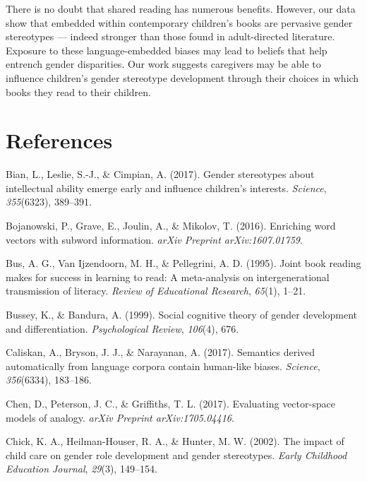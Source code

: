 \documentclass[
  english,
  ,man,floatsintext]{apa6}
\begin{document}
There is no doubt that shared reading has numerous benefits. However, our data show that embedded within contemporary children's books are pervasive gender stereotypes --- indeed stronger than those found in adult-directed literature. Exposure to these language-embedded biases may lead to beliefs that help entrench gender disparities. Our work suggests caregivers may be able to influence children's gender stereotype development through their choices in which books they read to their children.

\newpage

\hypertarget{references}{%
\section{References}\label{references}}

\setlength{\parindent}{-0.5in}
\setlength{\leftskip}{0.5in}

\hypertarget{refs}{}
\leavevmode\hypertarget{ref-bian2017gender}{}%
Bian, L., Leslie, S.-J., \& Cimpian, A. (2017). Gender stereotypes about intellectual ability emerge early and influence children's interests. \emph{Science}, \emph{355}(6323), 389--391.

\leavevmode\hypertarget{ref-bojanowski2016enriching}{}%
Bojanowski, P., Grave, E., Joulin, A., \& Mikolov, T. (2016). Enriching word vectors with subword information. \emph{arXiv Preprint arXiv:1607.01759}.

\leavevmode\hypertarget{ref-bus1995joint}{}%
Bus, A. G., Van Ijzendoorn, M. H., \& Pellegrini, A. D. (1995). Joint book reading makes for success in learning to read: A meta-analysis on intergenerational transmission of literacy. \emph{Review of Educational Research}, \emph{65}(1), 1--21.

\leavevmode\hypertarget{ref-bussey1999social}{}%
Bussey, K., \& Bandura, A. (1999). Social cognitive theory of gender development and differentiation. \emph{Psychological Review}, \emph{106}(4), 676.

\leavevmode\hypertarget{ref-caliskan2017semantics}{}%
Caliskan, A., Bryson, J. J., \& Narayanan, A. (2017). Semantics derived automatically from language corpora contain human-like biases. \emph{Science}, \emph{356}(6334), 183--186.

\leavevmode\hypertarget{ref-chen2017evaluating}{}%
Chen, D., Peterson, J. C., \& Griffiths, T. L. (2017). Evaluating vector-space models of analogy. \emph{arXiv Preprint arXiv:1705.04416}.

\leavevmode\hypertarget{ref-chick2002impact}{}%
Chick, K. A., Heilman-Houser, R. A., \& Hunter, M. W. (2002). The impact of child care on gender role development and gender stereotypes. \emph{Early Childhood Education Journal}, \emph{29}(3), 149--154.
\end{document}
